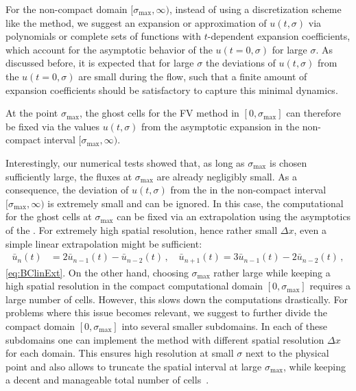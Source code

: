 \begin{enumerate}
	For the non-compact domain $[ \sigma_\mathrm{max}, \infty )$, instead of using a discretization scheme like the \fv{} method, we suggest an expansion or approximation of $u ( t, \sigma )$ via polynomials or complete sets of functions with $t$-dependent expansion coefficients, which account for the asymptotic behavior of the \ic{} $u ( t = 0, \sigma )$ for large $\sigma$. 
	As discussed before, it is expected that for large $\sigma$ the deviations of $u ( t, \sigma )$ from the \ic{} $u ( t = 0, \sigma )$ are small during the \frg{} flow, such that a finite amount of expansion coefficients should be satisfactory to capture this minimal dynamics.
	
	At the point $\sigma_\mathrm{max}$, the ghost cells for the FV method in $[ 0, \sigma_\mathrm{max} ]$ can therefore be fixed via the values $u ( t, \sigma )$ from the asymptotic expansion in the non-compact interval $[ \sigma_\mathrm{max}, \infty )$.
\end{enumerate}
Interestingly, our numerical tests showed that, as long as $\sigma_\mathrm{max}$ is chosen sufficiently large, the fluxes at $\sigma_\mathrm{max}$ are already negligibly small.
As a consequence, the deviation of $u ( t, \sigma )$ from the \ic{} in the non-compact interval $[ \sigma_\mathrm{max}, \infty )$ is extremely small and can be ignored.
In this case, the computational \bcs{} for the ghost cells at $\sigma_\mathrm{max}$ can be fixed via an extrapolation using the asymptotics of the \ic{}.
For extremely high spatial resolution, hence rather small $\Delta x$, even a simple linear extrapolation might be sufficient:
\begin{align}
	\bar{u}_{n}(t)&=2\bar{u}_{n-1}(t)-\bar{u}_{n-2}(t)\,,\quad\bar{u}_{n+1}(t)=3\bar{u}_{n-1}(t) -2\bar{u}_{n-2}(t)\,,
	\label{eq:phi0BCinf}
\end{align}
\cf{} \cref{eq:BClinExt}.
On the other hand, choosing $\sigma_\mathrm{max}$ rather large while keeping a high spatial resolution in the compact computational domain $[ 0, \sigma_\mathrm{max} ]$ requires a large number of cells.
However, this slows down the computations drastically.
For problems where this issue becomes relevant, we suggest to further divide the compact domain $[ 0, \sigma_\mathrm{max} ]$ into several smaller subdomains.
In each of these subdomains one can implement the \fv{} method with different spatial resolution $\Delta x$ for each domain. 
This ensures high resolution at small $\sigma$ next to the physical point and also allows to truncate the spatial interval at large $\sigma_\mathrm{max}$, while keeping a decent and manageable total number of cells~\cite{Grossi:2019urj,Grossi:2021ksl,Ihssen:2022xkr,Ihssen:2023xlp}.
